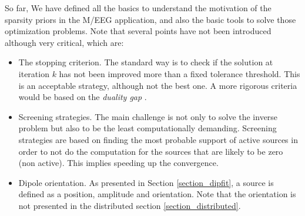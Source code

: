 So far, We have defined all the basics to understand the motivation of the sparsity priors in the M/EEG application, and also the basic tools to solve those optimization problems. Note that several points have not been introduced although very critical, which are:
\begin{itemize}
	\item The stopping criterion. The standard way is to check if the solution at iteration $k$ has not been improved more than a fixed tolerance threshold. This is an acceptable strategy, although not the best one. A more rigorous criteria would be based on the \textit{duality gap} \cite{boyd2004convex}.
    \item Screening strategies. The main challenge is not only to solve the inverse problem but also to be the least computationally demanding. Screening strategies are based on finding the most probable support of active sources in order to not do the computation for the sources that are likely to be zero (non active). This implies speeding up the convergence.
    \item Dipole orientation. As presented in Section \ref{section_dipfit}, a source is defined as a position, amplitude and orientation. Note that the orientation is not presented in the distributed section \ref{section_distributed}.
\end{itemize}
